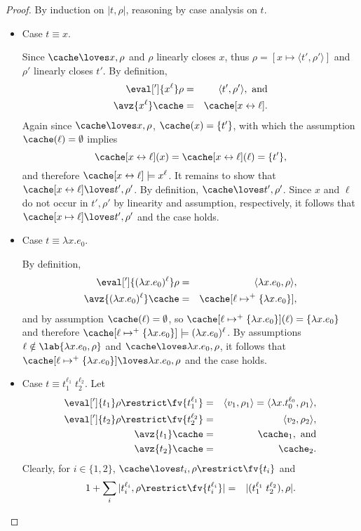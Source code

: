 \begin{proof} By induction on $|t,\rho|$, reasoning by case analysis on $t$.
\begin{itemize}
\item Case $t\equiv x$.

Since $\cache\loves x,\rho$ and $\rho$ linearly closes $x$, thus $\rho
= [x\mapsto \langle t',\rho'\rangle]$ and $\rho'$ linearly closes
$t'$.  By definition,
\begin{eqnarray*}
\eval[']{x^\ell}\rho &=& \langle t',\rho'\rangle, \mbox{ and}\\
\avz{x^\ell}\cache &=& \cache[x\leftrightarrow \ell].
\end{eqnarray*}
Again since $\cache\loves x,\rho$, $\cache(x) = \{t'\}$, with which the
assumption $\cache(\ell)=\emptyset$ implies
\begin{displaymath}
\cache[x\leftrightarrow\ell](x) =
\cache[x\leftrightarrow\ell](\ell) = 
\{t'\},
\end{displaymath}
and therefore $\cache[x\leftrightarrow\ell]\models x^\ell$.  It
remains to show that $\cache[x\leftrightarrow\ell]\loves t',\rho'$.
By definition, $\cache\loves t',\rho'$.  Since $x$ and $\ell$ do not
occur in $t',\rho'$ by linearity and assumption, respectively, it
follows that $\cache[x\mapsto\ell]\loves t',\rho'$ and the case
holds.

\item Case $t\equiv \lambda x.e_0$.

By definition,
\begin{eqnarray*}
\eval[']{(\lambda x.e_0)^\ell}\rho & = & \langle\lambda x.e_0,\rho\rangle,\\
\avz{(\lambda x.e_0)^\ell}\cache & = & \cache[\ell\mapsto^+ \{\lambda x.e_0\}],
\end{eqnarray*}
and by assumption $\cache(\ell) = \emptyset$, so $\cache[\ell\mapsto^+
\{\lambda x.e_0\}](\ell) = \{\lambda x.e_0\}$ and therefore
$\cache[\ell\mapsto^+ \{\lambda x.e_0\}]\models (\lambda x.e_0)^\ell$.
By assumptions $\ell\notin\lab{\lambda x.e_0,\rho}$ and
$\cache\loves\lambda x.e_0,\rho$, it follows that
$\cache[\ell\mapsto^+ \{\lambda x.e_0\}]\loves\lambda x.e_0,\rho$ and
the case holds.

\item Case $t\equiv t_1^{\ell_1}\; t_2^{\ell_2}$. Let
\begin{eqnarray*}
\eval[']{t_1}\rho\restrict\fv{t_1^{\ell_1}} &=& \langle v_1,\rho_1\rangle = \langle\lambda x.t_0^{\ell_0},\rho_1\rangle,\\
\eval[']{t_2}\rho\restrict\fv{t_2^{\ell_2}} &=& \langle v_2,\rho_2\rangle,\\
\avz{t_1}\cache &=& \cache_1, \mbox{ and}\\
\avz{t_2}\cache &=& \cache_2.
\end{eqnarray*}
Clearly, for $i \in \{1,2\}$, $\cache\loves t_i,\rho\restrict\fv{t_i}$ and
\begin{eqnarray*}
1+\sum_i |t_i^{\ell_i},\rho\restrict\fv{t_i^{\ell_i}}| &=& |(t_1^{\ell_1}\;t_2^{\ell_2}),\rho|.
\end{eqnarray*}


\end{itemize}
\end{proof}

